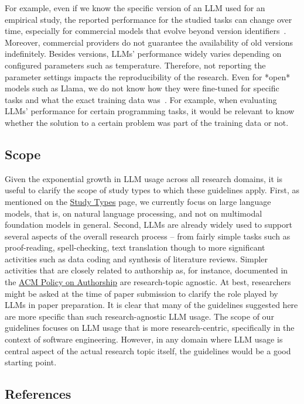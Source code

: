 
For example, even if we know the specific version of an LLM used for an empirical study, the reported performance for the studied tasks can change over time, especially for commercial models that evolve beyond version identifiers~\cite{DBLP:journals/corr/abs-2307-09009}.
Moreover, commercial providers do not guarantee the availability of old versions indefinitely.
Besides versions, LLMs' performance widely varies depending on configured parameters such as temperature.
Therefore, not reporting the parameter settings impacts the reproducibility of the research.
Even for *open* models such as Llama, we do not know how they were fine-tuned for specific tasks and what the exact training data was~\cite{Gibney2024}.
For example, when evaluating LLMs' performance for certain programming tasks, it would be relevant to know whether the solution to a certain problem was part of the training data or not.


\subsection{Scope}

Given the exponential growth in LLM usage across all research domains, it is useful to clarify the scope of study types to which these guidelines apply.
First, as mentioned on the \href{/study-types/}{Study Types} page, we currently focus on large language models, that is, on natural language processing, and not on multimodal foundation models in general.
Second, LLMs are already widely used to support several aspects of the overall research process – from fairly simple tasks such as proof-reading, spell-checking, text translation though to more significant activities such as data coding and synthesis of literature reviews.
Simpler activities that are closely related to authorship as, for instance, documented in the \href{https://www.acm.org/publications/policies/frequently-asked-questions}{ACM Policy on Authorship} are research-topic agnostic.
At best, researchers might be asked at the time of paper submission to clarify the role played by LLMs in paper preparation.
It is clear that many of the guidelines suggested here are more specific than such research-agnostic LLM usage.
The scope of our guidelines focuses on LLM usage that is more research-centric, specifically in the context of software engineering.
However, in any domain where LLM usage is central aspect of the actual research topic itself, the guidelines would be a good starting point.


\subsection{References}





